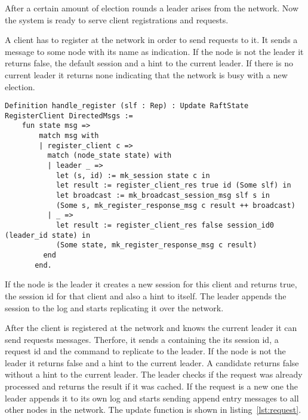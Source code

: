 After a certain amount of election rounds a leader arises from the
network. Now the system is ready to serve client registrations and requests.

A client has to register at the network in order to send requests to it.
It sends a  message to some node with its
name as indication. If the node is not the leader it returns
false, the default session and a hint to the current leader.
If there is no current leader it returns none indicating that
the network is busy with a new election.

\begin{lstlisting}[style=coq,label=lst:register,
caption=The definitions on how a node changes it node state.]
  Definition handle_register (slf : Rep) : Update RaftState RegisterClient DirectedMsgs :=
    fun state msg =>
        match msg with
        | register_client c =>
          match (node_state state) with
          | leader _ =>
            let (s, id) := mk_session state c in
            let result := register_client_res true id (Some slf) in
            let broadcast := mk_broadcast_session_msg slf s in
            (Some s, mk_register_response_msg c result ++ broadcast)
          | _ =>
            let result := register_client_res false session_id0 (leader_id state) in
            (Some state, mk_register_response_msg c result)
         end
       end.
\end{lstlisting}

If the node is the leader it creates a new session for this client and
returns true, the session id for that client and also a hint to itself.
The leader appends the session to the log and starts replicating it
over the network.

After the client is registered at the network and knows the current leader
it can send requests messages. Therfore, it sends a 
containing the its session id, a request id and the command to replicate
to the leader. If the node is not the leader it returns false and a hint
to the current leader. A candidate returns false without a hint to
the current leader. The leader checks if the request was already processed
and returns the result if it was cached. If the request is a new one the
leader appends it to its own log and starts sending append entry messages
to all other nodes in the network. The update function is shown in listing~\ref{lst:request}.

